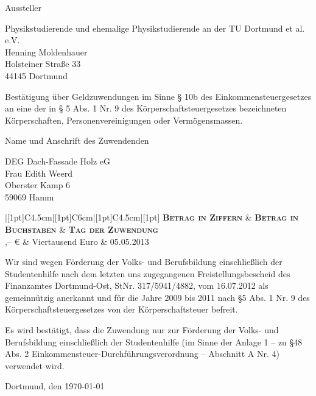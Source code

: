 \documentclass[fontsize=12pt, paper=a4, DIV14, parskip]{scrartcl}
\begin{document}
\parbox{20cm}{\hspace{1cm}}
\parbox{20cm}{\hspace{1cm}}

Aussteller

Physikstudierende und ehemalige Physikstudierende an der TU Dortmund et al. e.V.\\
Henning Moldenhauer\\
Holsteiner Straße 33\\
44145 Dortmund

Bestätigung über Geldzuwendungen im Sinne § 10b des Einkommensteuergesetzes an eine der in § 5 Abs. 1 Nr. 9 des Körperschaftsteuergesetzes bezeichneten Körperschaften, Personenvereinigungen oder Vermögensmassen.

Name und Anschrift des Zuwendenden

DEG Dach-Fassade Holz eG\\
Frau Edith Weerd\\ 
Oberster Kamp 6\\
59069 Hamm
\renewcommand{\arraystretch}{1.5}
\begin{table}[h!]
	\centering
	\begin{tabu}{|[1pt]C{4.5cm}|[1pt]C{6cm}|[1pt]C{4.5cm}|[1pt]}
		\tabucline[1pt]{-}
		{\bfseries \scshape Betrag in Ziffern}	&	{\bfseries \scshape Betrag in Buchstaben}	&	{\bfseries \scshape Tag der Zuwendung}\\
		\tabucline[1pt]{-}
		,-- €	&	Viertausend Euro	&	05.05.2013\\
		\tabucline[1pt]{-}
	\end{tabu}
\end{table}
\vspace{-.7cm}

{\small
Wir sind wegen Förderung der Volks- und Berufsbildung einschließlich der Studentenhilfe nach dem letzten uns zugegangenen Freistellungsbescheid des Finanzamtes Dortmund-Ost, StNr. 317/5941/4882, vom 16.07.2012 als gemeinnützig anerkannt und für die Jahre 2009 bis 2011 nach §5 Abs. 1 Nr. 9 des Körperschaftsteuergesetzes von der Körperschaftsteuer befreit.
\vspace{-.2cm}

Es wird bestätigt, dass die Zuwendung nur zur Förderung der Volks- und Berufsbildung einschließlich der Studentenhilfe (im Sinne der Anlage 1 – zu §48 Abs. 2 Einkommensteuer-Durchführungsverordnung – Abschnitt A Nr. 4) verwendet wird.}

Dortmund, den \today
\end{document}
